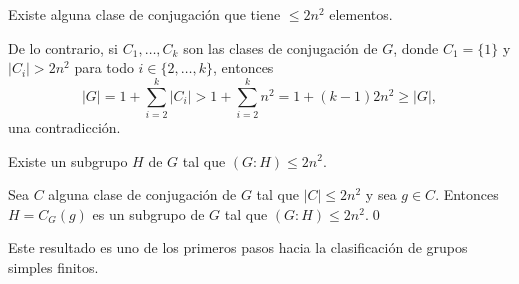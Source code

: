 \begin{claim}
Existe alguna clase de conjugación que tiene $\leq 2n^2$ elementos.
\end{claim}

De lo contrario, si $C_1,\dots,C_k$ son las clases de conjugación de $G$, donde 
$C_1=\{1\}$ y $|C_i|>2n^2$ para todo $i\in\{2,\dots,k\}$, entonces 
\[
|G|=1+\sum_{i=2}^k|C_i|>1+\sum_{i=2}^kn^2=1+(k-1)2n^2\geq |G|,
\]
una contradicción. 

\begin{claim}
Existe un subgrupo $H$ de $G$ tal que $(G:H)\leq 2n^2$.
\end{claim}

Sea $C$ alguna clase de conjugación de $G$ tal que $|C|\leq 2n^2$ y sea $g\in C$.  
Entonces $H=C_G(g)$ es un subgrupo de $G$ tal que $(G:H)\leq 2n^2$.\qed

\medskip
Este resultado es uno de los primeros pasos hacia la clasificación de grupos simples finitos. 
